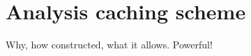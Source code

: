 \chapter{Analysis caching scheme}
\label{ch:caching_scheme_appendix}

Why, how constructed, what it allows. Powerful!